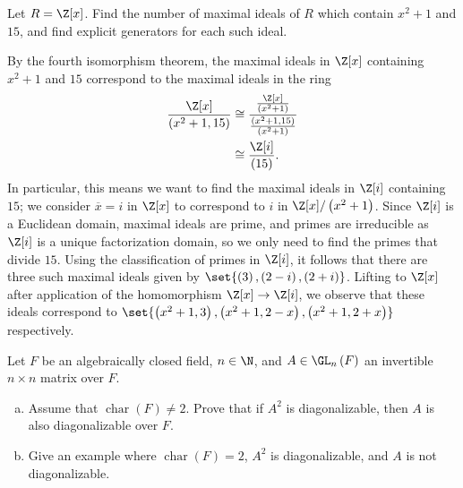 \documentclass[10pt]{mypackage}
\begin{document}
\begin{problem}[Problem 3]
  Let $R = \Z[x]$. Find the number of maximal ideals of $R$ which contain $x^2 + 1$ and $15$, and find explicit generators for each such ideal.
\end{problem}
\begin{solution}
  By the fourth isomorphism theorem, the maximal ideals in $\Z[x]$ containing $x^2 + 1$ and $15$ correspond to the maximal ideals in the ring
  \begin{align*}
    \frac{\Z[x]}{\left( x^2 + 1,15 \right)} &\cong \frac{\frac{\Z[x]}{\left( x^2 + 1 \right)}}{\frac{\left( x^2 + 1,15 \right)}{\left( x^2 + 1 \right)}}\\
                                            &\cong \frac{\Z[i]}{\left( 15 \right)}.
  \end{align*}
  In particular, this means we want to find the maximal ideals in $\Z[i]$ containing $15$; we consider $ \overline{x} = i $ in $\Z[x]$ to correspond to $i$ in $\Z[x]/\left( x^2 + 1 \right)$. Since $\Z[i]$ is a Euclidean domain, maximal ideals are prime, and primes are irreducible as $\Z[i]$ is a unique factorization domain, so we only need to find the primes that divide $15$. Using the classification of primes in $\Z[i]$, it follows that there are three such maximal ideals given by $\set{\left( 3 \right), \left( 2-i \right),\left( 2+i \right)}$. Lifting to $\Z[x]$ after application of the homomorphism $\Z[x]\rightarrow \Z[i]$, we observe that these ideals correspond to $\set{\left( x^2+1,3 \right), \left( x^2 + 1,2-x \right),\left( x^2 + 1,2+x \right)}$ respectively.
\end{solution}
\begin{problem}[Problem 5]
  Let $F$ be an algebraically closed field, $n\in \N$, and $A\in \GL_n\left( F \right)$ an invertible $n\times n$ matrix over $F$.
  \begin{enumerate}[(a)]
    \item Assume that $\operatorname{char}(F)\neq 2$. Prove that if $A^2$ is diagonalizable, then $A$ is also diagonalizable over $F$.
    \item Give an example where $\operatorname{char}\left( F \right) = 2$, $A^2$ is diagonalizable, and $A$ is not diagonalizable.
  \end{enumerate}
\end{problem}
\end{document}
